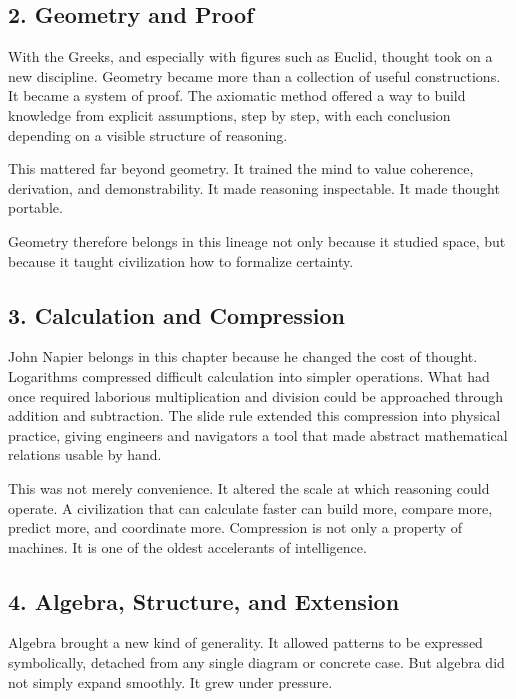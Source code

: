 \hypertarget{geometry-and-proof}{%
\subsection{2. Geometry and Proof}\label{geometry-and-proof}}

With the Greeks, and especially with figures such as Euclid, thought
took on a new discipline. Geometry became more than a collection of
useful constructions. It became a system of proof. The axiomatic method
offered a way to build knowledge from explicit assumptions, step by
step, with each conclusion depending on a visible structure of
reasoning.

This mattered far beyond geometry. It trained the mind to value
coherence, derivation, and demonstrability. It made reasoning
inspectable. It made thought portable.

Geometry therefore belongs in this lineage not only because it studied
space, but because it taught civilization how to formalize certainty.

\hypertarget{calculation-and-compression}{%
\subsection{3. Calculation and
Compression}\label{calculation-and-compression}}

John Napier belongs in this chapter because he changed the cost of
thought. Logarithms compressed difficult calculation into simpler
operations. What had once required laborious multiplication and division
could be approached through addition and subtraction. The slide rule
extended this compression into physical practice, giving engineers and
navigators a tool that made abstract mathematical relations usable by
hand.

This was not merely convenience. It altered the scale at which reasoning
could operate. A civilization that can calculate faster can build more,
compare more, predict more, and coordinate more. Compression is not only
a property of machines. It is one of the oldest accelerants of
intelligence.

\hypertarget{algebra-structure-and-extension}{%
\subsection{4. Algebra, Structure, and
Extension}\label{algebra-structure-and-extension}}

Algebra brought a new kind of generality. It allowed patterns to be
expressed symbolically, detached from any single diagram or concrete
case. But algebra did not simply expand smoothly. It grew under
pressure.

